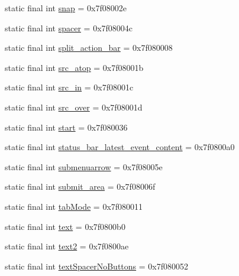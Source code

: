 \begin{CompactItemize}
\item 
static final int \hyperlink{classandroid_1_1support_1_1v7_1_1palette_1_1_r_1_1id_a21c295078627a7dd8886dea06f2fc49}{snap} = 0x7f08002e
\item 
static final int \hyperlink{classandroid_1_1support_1_1v7_1_1palette_1_1_r_1_1id_23c9dbb99a912647577e75e38d478dbb}{spacer} = 0x7f08004c
\item 
static final int \hyperlink{classandroid_1_1support_1_1v7_1_1palette_1_1_r_1_1id_ce11b335826d1a2c8c5fd5d7403de403}{split\_\-action\_\-bar} = 0x7f080008
\item 
static final int \hyperlink{classandroid_1_1support_1_1v7_1_1palette_1_1_r_1_1id_fd55e4ce8521748548f5bda64e8dfec1}{src\_\-atop} = 0x7f08001b
\item 
static final int \hyperlink{classandroid_1_1support_1_1v7_1_1palette_1_1_r_1_1id_288fe239574887d65909d2edf9b8449e}{src\_\-in} = 0x7f08001c
\item 
static final int \hyperlink{classandroid_1_1support_1_1v7_1_1palette_1_1_r_1_1id_4760835c7d60a873899833f64d58a4f5}{src\_\-over} = 0x7f08001d
\item 
static final int \hyperlink{classandroid_1_1support_1_1v7_1_1palette_1_1_r_1_1id_632b601f237a36bcc6f44fd47f9b9ca2}{start} = 0x7f080036
\item 
static final int \hyperlink{classandroid_1_1support_1_1v7_1_1palette_1_1_r_1_1id_0781c855cc8b150016b4f20db2d92537}{status\_\-bar\_\-latest\_\-event\_\-content} = 0x7f0800a0
\item 
static final int \hyperlink{classandroid_1_1support_1_1v7_1_1palette_1_1_r_1_1id_a7ac8f6f1d5413891763e0f9bb9c6bbd}{submenuarrow} = 0x7f08005e
\item 
static final int \hyperlink{classandroid_1_1support_1_1v7_1_1palette_1_1_r_1_1id_08c15e86d29410bd0285a8dc005e0e4a}{submit\_\-area} = 0x7f08006f
\item 
static final int \hyperlink{classandroid_1_1support_1_1v7_1_1palette_1_1_r_1_1id_a653f887f033b382f72b424242aff9f8}{tabMode} = 0x7f080011
\item 
static final int \hyperlink{classandroid_1_1support_1_1v7_1_1palette_1_1_r_1_1id_e3ec98d7d18be105105c4ada957aaf97}{text} = 0x7f0800b0
\item 
static final int \hyperlink{classandroid_1_1support_1_1v7_1_1palette_1_1_r_1_1id_2d98fcd92a649848343e99d55cac64a4}{text2} = 0x7f0800ae
\item 
static final int \hyperlink{classandroid_1_1support_1_1v7_1_1palette_1_1_r_1_1id_d5c5705cfff5d4484f44f0673e1f4333}{textSpacerNoButtons} = 0x7f080052

\end{CompactItemize}
